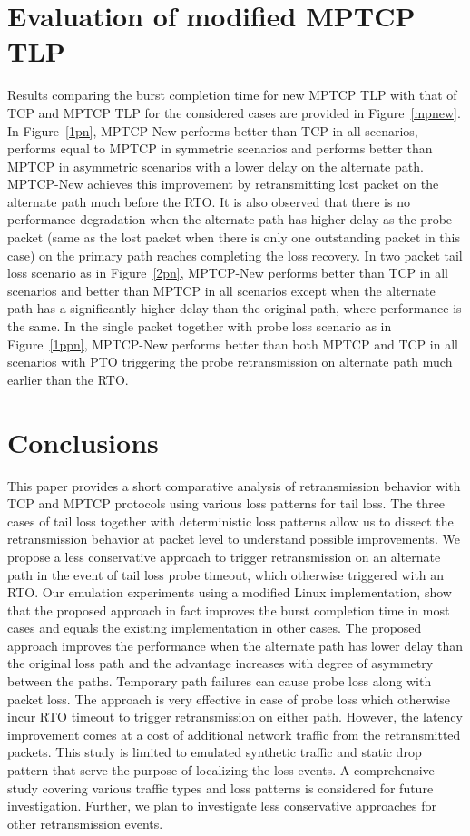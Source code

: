 \documentclass[10pt,conference]{IEEEtran}
\begin{document}
\section{Evaluation of modified MPTCP TLP}\label{eval}

Results comparing the burst completion time for new MPTCP TLP with that of TCP and MPTCP TLP for the considered cases are provided in 
Figure~\ref{mpnew}. In Figure~\ref{1pn}, MPTCP-New performs better than TCP in all scenarios, performs equal to MPTCP in symmetric scenarios and 
performs better than MPTCP in asymmetric scenarios with a lower delay on the alternate path. MPTCP-New achieves this improvement by retransmitting
 lost packet on the alternate path much before the RTO. It is also observed that there is no performance degradation when the alternate path has 
 higher delay as the probe packet (same as the lost packet when there is only one outstanding packet in this case) on the primary path reaches 
 completing the loss recovery. In two packet tail loss scenario as in Figure~\ref{2pn}, MPTCP-New performs better than TCP in all scenarios and better 
 than MPTCP in all scenarios except when the alternate path has a significantly higher delay than the original path, where performance is the same. 
 In the single packet together with probe loss scenario as in Figure~\ref{1ppn}, MPTCP-New performs better than both MPTCP and TCP in all scenarios 
 with PTO triggering the probe retransmission on alternate path much earlier than the RTO. 


\section{Conclusions}\label{conc}
This paper provides a short comparative analysis of retransmission behavior with TCP and MPTCP protocols using various loss patterns for tail loss.
The three cases of tail loss together with deterministic loss patterns allow us to dissect the retransmission behavior at packet level to 
understand possible improvements.
We propose a less conservative approach to trigger retransmission on an alternate path in the event of tail loss probe timeout, which otherwise 
triggered with an RTO. Our emulation experiments  using a modified Linux implementation, show that the proposed approach in fact improves the 
burst completion time in most cases and equals the existing implementation in other cases. The proposed approach improves the performance when 
the alternate path has lower delay than the original loss path and the advantage increases with degree of asymmetry between the paths. 
Temporary path failures can cause probe loss along with packet loss. The approach is very effective in case of probe loss which otherwise 
incur RTO timeout to trigger retransmission on either path. However, the latency improvement comes at a cost of additional network traffic 
from the retransmitted packets. This study is limited to emulated synthetic traffic and static drop pattern that serve the purpose of localizing 
the loss events. A comprehensive study covering various traffic types and loss patterns is considered for future investigation. Further, we plan 
to investigate less conservative approaches for other retransmission events.
\end{document}
